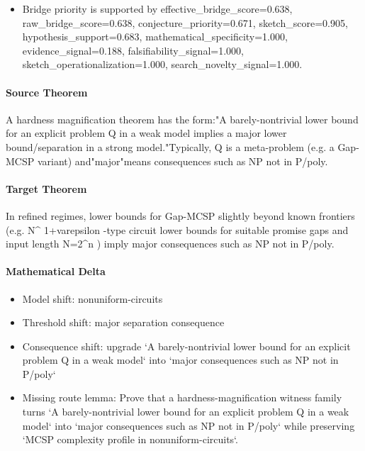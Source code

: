 \documentclass[11pt]{article}
\begin{document}
\begin{itemize}
\item Bridge priority is supported by effective\_bridge\_score=0.638, raw\_bridge\_score=0.638, conjecture\_priority=0.671, sketch\_score=0.905, hypothesis\_support=0.683, mathematical\_specificity=1.000, evidence\_signal=0.188, falsifiability\_signal=1.000, sketch\_operationalization=1.000, search\_novelty\_signal=1.000.
\end{itemize}
\paragraph{Source Theorem}
A hardness magnification theorem has the form:"A barely-nontrivial lower bound for an explicit problem Q in a weak model implies a major lower bound/separation in a strong model."Typically, Q is a meta-problem (e.g. a Gap-MCSP variant) and"major"means consequences such as NP not in P/poly.
\paragraph{Target Theorem}
In refined regimes, lower bounds for Gap-MCSP slightly beyond known frontiers (e.g. N\textasciicircum{} 1+varepsilon -type circuit lower bounds for suitable promise gaps and input length N=2\textasciicircum{}n ) imply major consequences such as NP not in P/poly.
\paragraph{Mathematical Delta}
\begin{itemize}
\item Model shift: nonuniform-circuits
\item Threshold shift: major separation consequence
\item Consequence shift: upgrade `A barely-nontrivial lower bound for an explicit problem Q in a weak model` into `major consequences such as NP not in P/poly`
\item Missing route lemma: Prove that a hardness-magnification witness family turns `A barely-nontrivial lower bound for an explicit problem Q in a weak model` into `major consequences such as NP not in P/poly` while preserving `MCSP complexity profile in nonuniform-circuits`.
\end{itemize}
\end{document}
